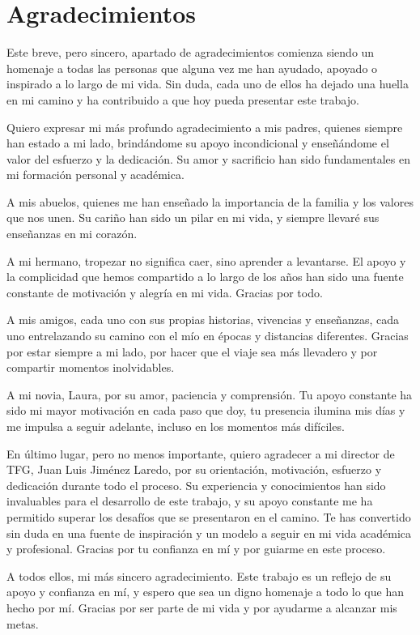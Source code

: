 \chapter*{Agradecimientos}

Este breve, pero sincero, apartado de agradecimientos comienza siendo un homenaje a todas las personas que alguna vez me han ayudado, apoyado o inspirado a lo largo de mi vida. Sin duda, cada uno de ellos ha dejado una huella en mi camino y ha contribuido a que hoy pueda presentar este trabajo.

Quiero expresar mi más profundo agradecimiento a mis padres, quienes siempre han estado a mi lado, brindándome su apoyo incondicional y enseñándome el valor del esfuerzo y la dedicación. Su amor y sacrificio han sido fundamentales en mi formación personal y académica.

A mis abuelos, quienes me han enseñado la importancia de la familia y los valores que nos unen. Su cariño han sido un pilar en mi vida, y siempre llevaré sus enseñanzas en mi corazón.

A mi hermano, tropezar no significa caer, sino aprender a levantarse. El apoyo y la complicidad que hemos compartido a lo largo de los años han sido una fuente constante de motivación y alegría en mi vida. Gracias por todo.

A mis amigos, cada uno con sus propias historias, vivencias y enseñanzas, cada uno entrelazando su camino con el mío en épocas y distancias diferentes. Gracias por estar siempre a mi lado, por hacer que el viaje sea más llevadero y por compartir momentos inolvidables.

A mi novia, Laura, por su amor, paciencia y comprensión. Tu apoyo constante ha sido mi mayor motivación en cada paso que doy, tu presencia ilumina mis días y me impulsa a seguir adelante, incluso en los momentos más difíciles.

En último lugar, pero no menos importante, quiero agradecer a mi director de TFG, Juan Luis Jiménez Laredo, por su orientación, motivación, esfuerzo y dedicación durante todo el proceso. Su experiencia y conocimientos han sido invaluables para el desarrollo de este trabajo, y su apoyo constante me ha permitido superar los desafíos que se presentaron en el camino. Te has convertido sin duda en una fuente de inspiración y un modelo a seguir en mi vida académica y profesional. Gracias por tu confianza en mí y por guiarme en este proceso.

A todos ellos, mi más sincero agradecimiento. Este trabajo es un reflejo de su apoyo y confianza en mí, y espero que sea un digno homenaje a todo lo que han hecho por mí. Gracias por ser parte de mi vida y por ayudarme a alcanzar mis metas.
